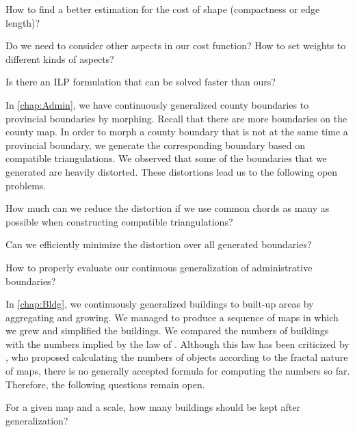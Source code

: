 \begin{open}
How to find a better estimation for the cost of shape 
(compactness or edge length)?
\end{open} 

\begin{open}
Do we need to consider other aspects in our cost function?
How to set weights to different kinds of aspects?
\end{open}

\begin{open}
Is there an ILP formulation that can be solved faster than ours?
\end{open}

In \chap\ref{chap:Admin}, 
we have continuously generalized 
county boundaries to provincial boundaries by morphing.
Recall that there are more boundaries on the county map.
In order to morph a county boundary 
that is not at the same time a provincial boundary,
we generate the corresponding boundary based on
compatible triangulations.
We observed that some of the boundaries 
that we generated are heavily distorted.  
These distortions lead us to the following open problems.

\begin{open}
  How much can we reduce the distortion 
  if we use common chords as many as possible
  when constructing compatible triangulations?
\end{open} 

\begin{open}
  Can we efficiently minimize the distortion 
  over all generated boundaries?
\end{open} 

\begin{open}
  How to properly evaluate our continuous generalization 
  of administrative boundaries?
\end{open}

In \chap\ref{chap:Bldg}, we continuously 
generalized buildings to built-up areas
by aggregating and growing.
We managed to produce a sequence of maps 
in which we grew and simplified the buildings.
We compared the numbers of buildings 
with the numbers implied 
by the law of \textcite{Topfer1966}.
Although this law has been criticized by 
\textcite{Jiang2015Fractal},
who proposed calculating the numbers of objects
according to the fractal nature of maps,
there is no generally accepted formula for 
computing the numbers so far.  
Therefore, the following questions remain open.

\begin{open}
  For a given map and a scale, 
  how many buildings should be kept after generalization?
\end{open}


